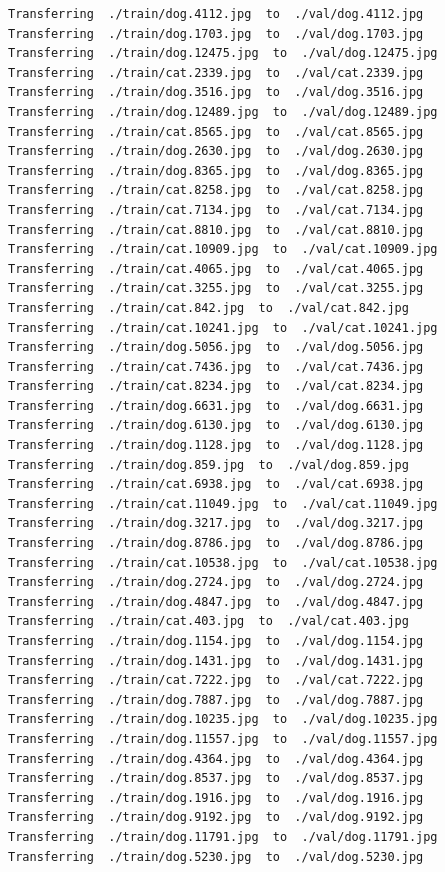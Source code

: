 \documentclass[]{book}
\theoremstyle{definition}
\theoremstyle{definition}
\theoremstyle{definition}
\theoremstyle{remark}
\begin{document}
\begin{verbatim}
Transferring  ./train/dog.4112.jpg  to  ./val/dog.4112.jpg
Transferring  ./train/dog.1703.jpg  to  ./val/dog.1703.jpg
Transferring  ./train/dog.12475.jpg  to  ./val/dog.12475.jpg
Transferring  ./train/cat.2339.jpg  to  ./val/cat.2339.jpg
Transferring  ./train/dog.3516.jpg  to  ./val/dog.3516.jpg
Transferring  ./train/dog.12489.jpg  to  ./val/dog.12489.jpg
Transferring  ./train/cat.8565.jpg  to  ./val/cat.8565.jpg
Transferring  ./train/dog.2630.jpg  to  ./val/dog.2630.jpg
Transferring  ./train/dog.8365.jpg  to  ./val/dog.8365.jpg
Transferring  ./train/cat.8258.jpg  to  ./val/cat.8258.jpg
Transferring  ./train/cat.7134.jpg  to  ./val/cat.7134.jpg
Transferring  ./train/cat.8810.jpg  to  ./val/cat.8810.jpg
Transferring  ./train/cat.10909.jpg  to  ./val/cat.10909.jpg
Transferring  ./train/cat.4065.jpg  to  ./val/cat.4065.jpg
Transferring  ./train/cat.3255.jpg  to  ./val/cat.3255.jpg
Transferring  ./train/cat.842.jpg  to  ./val/cat.842.jpg
Transferring  ./train/cat.10241.jpg  to  ./val/cat.10241.jpg
Transferring  ./train/dog.5056.jpg  to  ./val/dog.5056.jpg
Transferring  ./train/cat.7436.jpg  to  ./val/cat.7436.jpg
Transferring  ./train/cat.8234.jpg  to  ./val/cat.8234.jpg
Transferring  ./train/dog.6631.jpg  to  ./val/dog.6631.jpg
Transferring  ./train/dog.6130.jpg  to  ./val/dog.6130.jpg
Transferring  ./train/dog.1128.jpg  to  ./val/dog.1128.jpg
Transferring  ./train/dog.859.jpg  to  ./val/dog.859.jpg
Transferring  ./train/cat.6938.jpg  to  ./val/cat.6938.jpg
Transferring  ./train/cat.11049.jpg  to  ./val/cat.11049.jpg
Transferring  ./train/dog.3217.jpg  to  ./val/dog.3217.jpg
Transferring  ./train/dog.8786.jpg  to  ./val/dog.8786.jpg
Transferring  ./train/cat.10538.jpg  to  ./val/cat.10538.jpg
Transferring  ./train/dog.2724.jpg  to  ./val/dog.2724.jpg
Transferring  ./train/dog.4847.jpg  to  ./val/dog.4847.jpg
Transferring  ./train/cat.403.jpg  to  ./val/cat.403.jpg
Transferring  ./train/dog.1154.jpg  to  ./val/dog.1154.jpg
Transferring  ./train/dog.1431.jpg  to  ./val/dog.1431.jpg
Transferring  ./train/cat.7222.jpg  to  ./val/cat.7222.jpg
Transferring  ./train/dog.7887.jpg  to  ./val/dog.7887.jpg
Transferring  ./train/dog.10235.jpg  to  ./val/dog.10235.jpg
Transferring  ./train/dog.11557.jpg  to  ./val/dog.11557.jpg
Transferring  ./train/dog.4364.jpg  to  ./val/dog.4364.jpg
Transferring  ./train/dog.8537.jpg  to  ./val/dog.8537.jpg
Transferring  ./train/dog.1916.jpg  to  ./val/dog.1916.jpg
Transferring  ./train/dog.9192.jpg  to  ./val/dog.9192.jpg
Transferring  ./train/dog.11791.jpg  to  ./val/dog.11791.jpg
Transferring  ./train/dog.5230.jpg  to  ./val/dog.5230.jpg

\end{verbatim}
\end{document}
